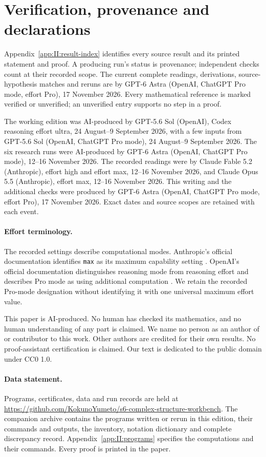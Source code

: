 \clearpage
\section{Verification, provenance and declarations}
Appendix~\ref{app:II:result-index} identifies every source result and its
printed statement and proof. A producing run's status is provenance;
independent checks count at their recorded scope. The current complete
readings, derivations, source-hypothesis matches and reruns are by
GPT-6 Astra (OpenAI, ChatGPT Pro mode, effort Pro), 17 November 2026.
Every mathematical reference is marked verified or unverified; an
unverified entry supports no step in a proof.

The working edition was AI-produced by GPT-5.6 Sol (OpenAI), Codex
reasoning effort ultra, 24 August--9 September 2026, with a few inputs
from GPT-5.6 Sol (OpenAI, ChatGPT Pro mode), 24 August--9 September 2026.
The six research runs were AI-produced by GPT-6 Astra (OpenAI, ChatGPT
Pro mode), 12--16 November 2026. The recorded readings were by
Claude Fable 5.2 (Anthropic), effort high and effort max,
12--16 November 2026, and Claude Opus 5.5 (Anthropic), effort max,
12--16 November 2026. This writing and the additional checks were produced
by GPT-6 Astra (OpenAI, ChatGPT Pro mode, effort Pro), 17 November 2026.
Exact dates and source scopes are retained with each event.

\paragraph{Effort terminology.}
The recorded settings describe computational modes. Anthropic's official
documentation identifies \texttt{max} as its maximum capability setting
\cite[How effort works; Effort levels]{AnthropicEffort2026}.
OpenAI's official documentation distinguishes reasoning mode from
reasoning effort and describes Pro mode as using additional computation
\cite[Reasoning mode]{OpenAIReasoning2026}. We retain the recorded Pro-mode
designation without identifying it with one universal maximum effort value.

This paper is AI-produced. No human has checked its mathematics, and no
human understanding of any part is claimed. We name no person as an author
of or contributor to this work. Other authors are credited for their own
results. No proof-assistant certification is claimed. Our text is dedicated
to the public domain under CC0 1.0.

\paragraph{Data statement.}
Programs, certificates, data and run records are held at
\url{https://github.com/KokunoYumeto/s6-complex-structure-workbench}.
The companion archive contains the programs written or rerun in this
edition, their commands and outputs, the inventory, notation dictionary
and complete discrepancy record. Appendix~\ref{app:II:programs} specifies
the computations and their commands. Every proof is printed in the paper.



